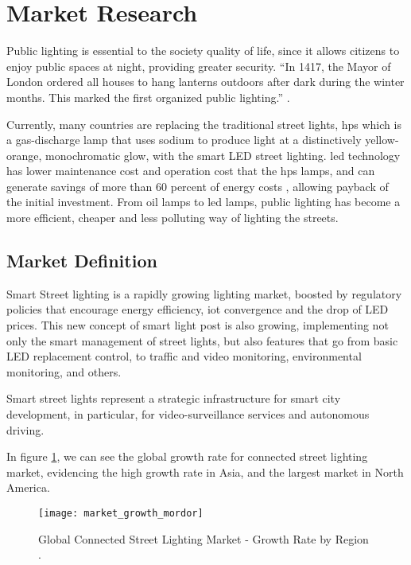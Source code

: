 \section{Market Research}
Public lighting is essential to the society quality of life, since it allows citizens to enjoy public spaces at night, providing greater security. “In 1417, the Mayor of London ordered all houses to hang lanterns outdoors after dark during the winter months. This marked the first organized public lighting.”  \cite{street_lighting_history}.

Currently, many countries are replacing the traditional street lights, \ac{hps} which is a gas-discharge lamp that uses sodium to produce light at a distinctively yellow-orange, monochromatic glow, with the smart LED street lighting. \ac{led} technology has lower maintenance cost and operation cost that the \ac{hps} lamps, and can generate savings of more than 60 percent of energy costs \cite{light_pollution}, allowing payback of the initial investment. From oil lamps to \ac{led} lamps, public lighting has become a more efficient, cheaper and less polluting way of lighting the streets.

\subsection{Market Definition}
Smart Street lighting is a rapidly growing lighting market, boosted by regulatory policies that encourage energy efficiency, \ac{iot} convergence and the drop of LED prices. This new concept of smart light post is also growing, implementing not only the smart management of street lights, but also features that go from basic LED replacement control, to traffic and video monitoring, environmental monitoring, and others.

Smart street lights represent a strategic infrastructure for smart city development, in particular, for video-surveillance services and autonomous driving. \cite{market_growth_2}

In figure \ref{fig:market_growth}, we can see the global growth rate for connected street lighting market, evidencing the high growth rate in Asia, and the largest market in North America.

\begin{figure}[ht]
	\centering
	\texttt{[image: market\_growth\_mordor]}
	\caption{Global Connected Street Lighting Market - Growth Rate by Region \cite{market_growth}.}
	\label{fig:market_growth}
\end{figure}

